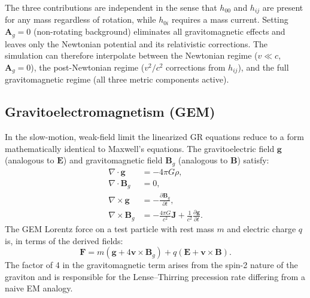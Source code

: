\documentclass[11pt,a4paper]{article}
\newcommand{\vv}[1]{\mathbf{#1}}
\newcommand{\Ag}{\vv{A}_g}
\begin{document}
The three contributions are independent in the sense that $h_{00}$ and $h_{ij}$ are present for any mass regardless of rotation, while $h_{0i}$ requires a mass current.  Setting $\Ag = 0$ (non-rotating background) eliminates all gravitomagnetic effects and leaves only the Newtonian potential and its relativistic corrections.  The simulation can therefore interpolate between the Newtonian regime ($v\ll c$, $\Ag = 0$), the post-Newtonian regime ($v^2/c^2$ corrections from $h_{ij}$), and the full gravitomagnetic regime (all three metric components active).

\subsection{Gravitoelectromagnetism (GEM)}

In the slow-motion, weak-field limit the linearized GR equations reduce to a form mathematically identical to Maxwell's equations.  The gravitoelectric field $\vv{g}$ (analogous to $\vv{E}$) and gravitomagnetic field $\vv{B}_g$ (analogous to $\vv{B}$) satisfy:
\begin{align}
  \nabla\cdot\vv{g}   &= -4\pi G\rho, \\
  \nabla\cdot\vv{B}_g &= 0, \\
  \nabla\times\vv{g}  &= -\frac{\partial\vv{B}_g}{\partial t}, \\
  \nabla\times\vv{B}_g &= -\frac{4\pi G}{c^2}\vv{J} + \frac{1}{c^2}\frac{\partial\vv{g}}{\partial t}.
\end{align}
The GEM Lorentz force on a test particle with rest mass $m$ and electric charge $q$ is, in terms of the derived fields:
\begin{equation}
  \vv{F} = m\!\left(\vv{g} + 4\vv{v}\times\vv{B}_g\right) + q\!\left(\vv{E} + \vv{v}\times\vv{B}\right).
\end{equation}
The factor of 4 in the gravitomagnetic term arises from the spin-2 nature of the graviton and is responsible for the Lense--Thirring precession rate differing from a naive EM analogy.
\end{document}
